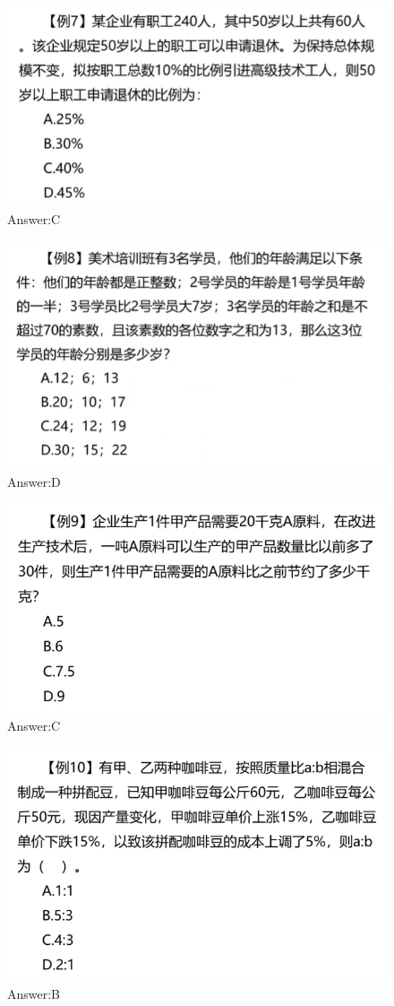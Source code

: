 \documentclass{article}
\numberwithin{equation}{section}						%
\numberwithin{figure}{section}							%
\begin{document}
\begin{sloppypar}
\begin{figure}[H]
     \centering
     \includegraphics[width=0.6\linewidth]{242.png}
		\caption{Answer:C}
\end{figure}

\begin{figure}[H]
     \centering
     \includegraphics[width=0.6\linewidth]{243.png}
		\caption{Answer:D}
\end{figure}

\begin{figure}[H]
     \centering
     \includegraphics[width=0.6\linewidth]{244.png}
		\caption{Answer:C}
\end{figure}


\begin{figure}[H]
     \centering
     \includegraphics[width=0.6\linewidth]{245.png}
		\caption{Answer:B}
\end{figure}



\end{sloppypar}
\end{document}
